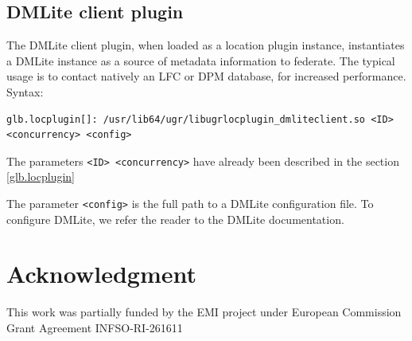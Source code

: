 \documentclass[12pt]{article} %
\begin{document}
\subsection{DMLite client plugin}

The DMLite client plugin, when loaded as a location plugin instance, instantiates a DMLite instance as a source of metadata information to federate. The typical usage is to contact natively an LFC or DPM database, for increased performance.\\

Syntax:\\
\begin{lstlisting}
glb.locplugin[]: /usr/lib64/ugr/libugrlocplugin_dmliteclient.so <ID> <concurrency> <config>
\end{lstlisting}

The parameters \lstinline"<ID> <concurrency>" have already been described in the section \ref{glb.locplugin}

The parameter \lstinline"<config>" is the full path to a DMLite configuration file. To configure DMLite, we refer the reader to the DMLite documentation.



\section*{Acknowledgment}

This work was partially funded by the EMI project under European
Commission Grant Agreement INFSO-RI-261611
\end{document}
